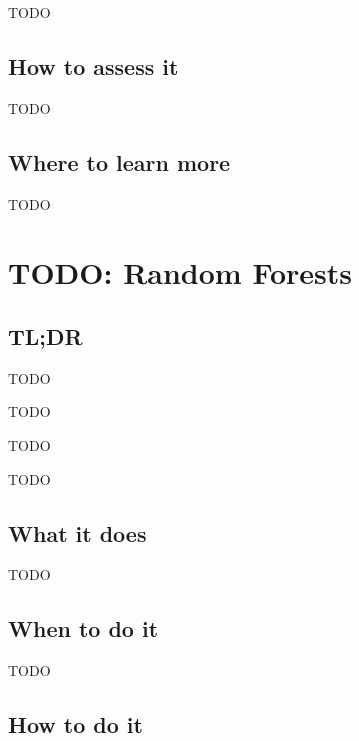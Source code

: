 \documentclass[
]{book}
\providecommand{\tightlist}{%
  \setlength{\itemsep}{0pt}\setlength{\parskip}{0pt}}
\begin{document}
TODO

\hypertarget{how-to-assess-it-15}{%
\section{How to assess it}\label{how-to-assess-it-15}}

TODO

\hypertarget{where-to-learn-more-15}{%
\section{Where to learn more}\label{where-to-learn-more-15}}

TODO

\hypertarget{random-forests}{%
\chapter{TODO: Random Forests}\label{random-forests}}

\hypertarget{tldr-16}{%
\section{TL;DR}\label{tldr-16}}

\begin{description}
\tightlist
\item[What it does]
TODO
\item[When to do it]
TODO
\item[How to do it]
TODO
\item[How to assess it]
TODO
\end{description}

\hypertarget{what-it-does-16}{%
\section{What it does}\label{what-it-does-16}}

TODO

\hypertarget{when-to-do-it-16}{%
\section{When to do it}\label{when-to-do-it-16}}

TODO

\hypertarget{how-to-do-it-16}{%
\section{How to do it}\label{how-to-do-it-16}}
\end{document}

